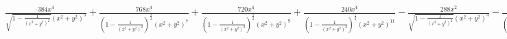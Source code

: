 \documentclass[11pt]{article}
\begin{document}
    
    $\frac{384 x^{4}}{\sqrt{1 - \frac{1}{\left(x^{2} + y^{2}\right)^{2}}} \left(x^{2} + y^{2}\right)^{5}} + \frac{768 x^{4}}{\left(1 - \frac{1}{\left(x^{2} + y^{2}\right)^{2}}\right)^{\frac{3}{2}} \left(x^{2} + y^{2}\right)^{7}} + \frac{720 x^{4}}{\left(1 - \frac{1}{\left(x^{2} + y^{2}\right)^{2}}\right)^{\frac{5}{2}} \left(x^{2} + y^{2}\right)^{9}} + \frac{240 x^{4}}{\left(1 - \frac{1}{\left(x^{2} + y^{2}\right)^{2}}\right)^{\frac{7}{2}} \left(x^{2} + y^{2}\right)^{11}} - \frac{288 x^{2}}{\sqrt{1 - \frac{1}{\left(x^{2} + y^{2}\right)^{2}}} \left(x^{2} + y^{2}\right)^{4}} - \frac{336 x^{2}}{\left(1 - \frac{1}{\left(x^{2} + y^{2}\right)^{2}}\right)^{\frac{3}{2}} \left(x^{2} + y^{2}\right)^{6}} - \frac{144 x^{2}}{\left(1 - \frac{1}{\left(x^{2} + y^{2}\right)^{2}}\right)^{\frac{5}{2}} \left(x^{2} + y^{2}\right)^{8}} + \frac{24}{\sqrt{1 - \frac{1}{\left(x^{2} + y^{2}\right)^{2}}} \left(x^{2} + y^{2}\right)^{3}} + \frac{12}{\left(1 - \frac{1}{\left(x^{2} + y^{2}\right)^{2}}\right)^{\frac{3}{2}} \left(x^{2} + y^{2}\right)^{5}}$
\end{document}
